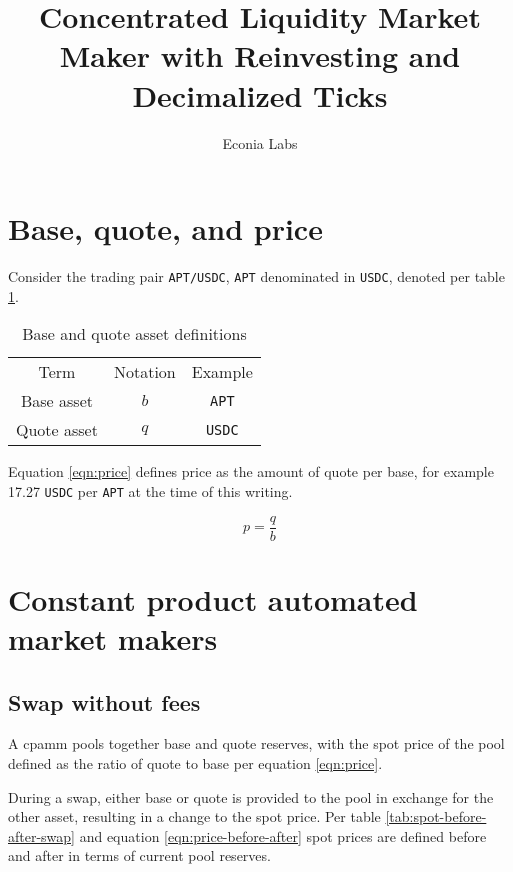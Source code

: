 \documentclass[table, twocolumn]{article}
\title{Concentrated Liquidity Market Maker with Reinvesting and Decimalized Ticks}
\author{Econia Labs}
\date{}
\begin{document}
\maketitle

\section{Base, quote, and price}

Consider the trading pair \texttt{APT/USDC}, \texttt{APT} denominated in \texttt{USDC}, denoted per
table \ref{tab:base-quote-definition}.

\begin{table}[!htb]
  \centering
  \begin{tabular}{|c|c|c|}
    \hline
    \rowcolor{cyan}
    Term        & Notation & Example       \\
    Base asset  & $b$      & \texttt{APT}  \\
    Quote asset & $q$      & \texttt{USDC} \\
    \hline
  \end{tabular}
  \caption{Base and quote asset definitions}
  \label{tab:base-quote-definition}
\end{table}

Equation \ref{eqn:price} defines price as the amount of quote per base, for example 17.27
\texttt{USDC} per \texttt{APT} at the time of this writing.

\begin{equation} \label{eqn:price}
  p = \frac{q}{b}
\end{equation}

\section{Constant product automated market makers}

\subsection{Swap without fees}

A \gls{cpamm} pools together base and quote reserves, with the spot price of the pool defined as the
ratio of quote to base per equation \ref{eqn:price}.

During a swap, either base or quote is provided to the pool in exchange for the other asset,
resulting in a change to the spot price. Per table \ref{tab:spot-before-after-swap} and equation
\ref{eqn:price-before-after} spot prices are defined before and after in terms of current pool
reserves.
\end{document}
